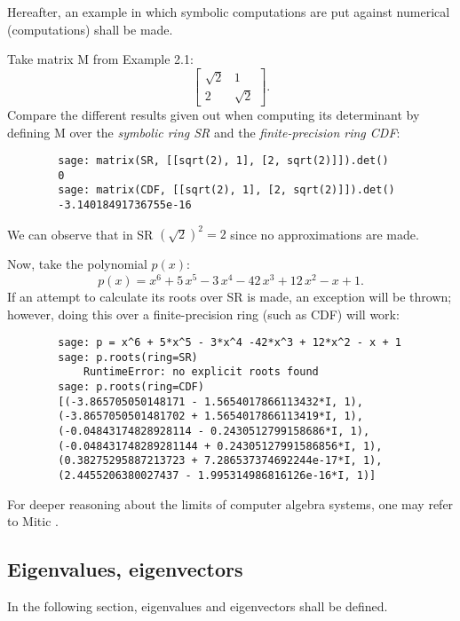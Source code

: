 Hereafter, an example in which symbolic computations are put against numerical (computations) shall be made.
\begin{example}
    Take matrix M from Example 2.1:
    \[
        \begin{bmatrix}
            \sqrt{2}  &   1    \\
                2     & \sqrt{2}
        \end{bmatrix}.
    \]
    Compare the different results given out when computing its determinant by defining M over the \textit{symbolic ring SR} and
    the \textit{finite-precision ring CDF}:
    \begin{verbatim}
        sage: matrix(SR, [[sqrt(2), 1], [2, sqrt(2)]]).det()
        0
        sage: matrix(CDF, [[sqrt(2), 1], [2, sqrt(2)]]).det()
        -3.14018491736755e-16
    \end{verbatim}
    We can observe that in SR \((\sqrt{2})^2 = 2\) since no approximations are made.

    Now, take the polynomial \(p(x)\):
    \[
        p(x) = x^{6} + 5 \, x^{5} - 3 \, x^{4} - 42 \, x^{3} + 12 \, x^{2} - x + 1.
    \]
    If an attempt to calculate its roots over SR is made, an exception will be thrown; however, doing this over a finite-precision ring
    (such as CDF) will work:
    \begin{verbatim}
        sage: p = x^6 + 5*x^5 - 3*x^4 -42*x^3 + 12*x^2 - x + 1
        sage: p.roots(ring=SR)
            RuntimeError: no explicit roots found
        sage: p.roots(ring=CDF)
        [(-3.865705050148171 - 1.5654017866113432*I, 1),
        (-3.8657050501481702 + 1.5654017866113419*I, 1),
        (-0.04843174828928114 - 0.2430512799158686*I, 1),
        (-0.048431748289281144 + 0.24305127991586856*I, 1),
        (0.38275295887213723 + 7.286537374692244e-17*I, 1),
        (2.4455206380027437 - 1.995314986816126e-16*I, 1)]
    \end{verbatim}
\end{example}

For deeper reasoning about the limits of computer algebra systems, one may refer to Mitic \cite{mitic}.

\subsection*{Eigenvalues, eigenvectors}
In the following section, eigenvalues and eigenvectors shall be defined.

